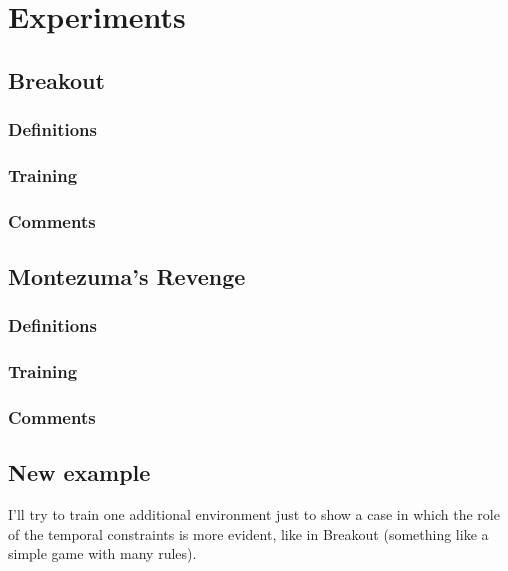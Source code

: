 \chapter{Experiments}

\section{Breakout}
\subsection{Definitions}
\subsection{Training}
\subsection{Comments}

\section{Montezuma's Revenge}
\subsection{Definitions}
\subsection{Training}
\subsection{Comments}

\section{New example}
I'll try to train one additional environment just to show a case in which the
role of the temporal constraints is more evident, like in Breakout (something
like a simple game with many rules).
